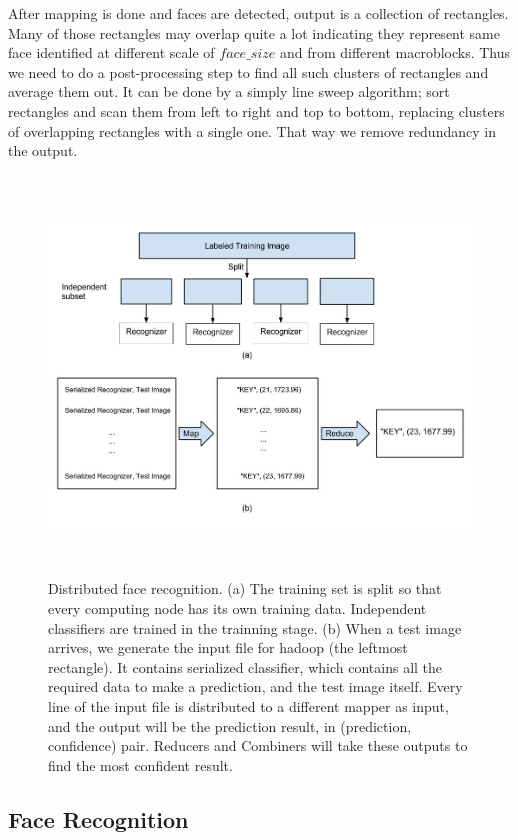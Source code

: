 \documentclass[11pt, draftclsnofoot, onecolumn]{IEEEtran}
\begin{document}
After mapping is done and faces are detected, output is a collection of rectangles. Many of those rectangles may overlap quite a lot indicating they represent same face identified at different scale of $face\_size$ and from different macroblocks. Thus we need to do a post-processing step to find all such clusters of rectangles and average them out. It can be done by a simply line sweep algorithm; sort rectangles and scan them from left to right and top to bottom, replacing clusters of overlapping rectangles with a single one. That way we remove redundancy in the output. 

\begin{figure}
\centering
\includegraphics[height=300pt]{recog_overview}
\caption{Distributed face recognition. (a) The training set is split so that every computing node has its own training data. Independent classifiers are trained in the trainning stage. (b) When a test image arrives, we generate the input file for hadoop (the leftmost rectangle). It contains serialized classifier, which contains all the required data to make a prediction, and the test image itself. Every line of the input file is distributed to a different mapper as input, and the output will be the prediction result, in (prediction, confidence) pair. Reducers and Combiners will take these outputs to find the most confident result.}
\label{fig:recog_overview}
\end{figure}

\subsection{Face Recognition}
\end{document}
